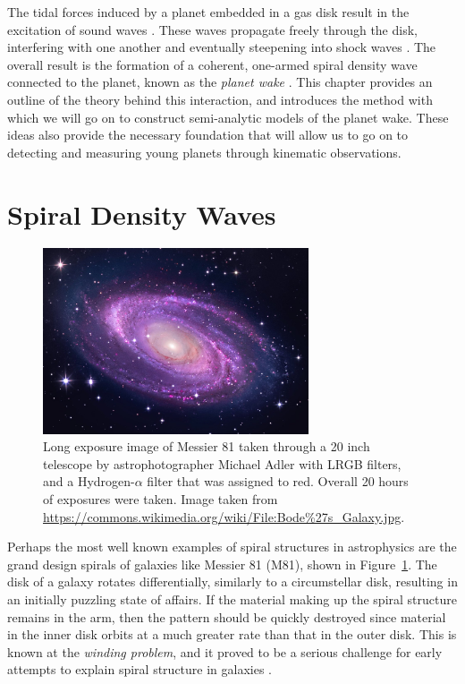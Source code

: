 The tidal forces induced by a planet embedded in a gas disk result in the excitation of sound waves \citep{goldreich1980}.
These waves propagate freely through the disk, interfering with one another and eventually steepening into shock waves \citep{goodman2001}.
The overall result is the formation of a coherent, one-armed spiral density wave connected to the planet, known as the \textit{planet wake} \citep{ogilvie2002}. 
This chapter provides an outline of the theory behind this interaction, and introduces the method with which we will go on to construct semi-analytic models of the planet wake.
These ideas also provide the necessary foundation that will allow us to go on to detecting and measuring young planets through kinematic observations.

\section{Spiral Density Waves}

\begin{figure}
    \centering
    \includegraphics[width = 0.7\textwidth]{figures/M81.jpeg}
    \caption{Long exposure image of Messier 81 taken through a 20 inch telescope by astrophotographer Michael Adler with LRGB filters, and a Hydrogen-$\alpha$ filter that was assigned to red. Overall 20 hours of exposures were taken. Image taken from \url{https://commons.wikimedia.org/wiki/File:Bode\%27s_Galaxy.jpg}.}
    \label{fig:M81}
\end{figure}

Perhaps the most well known examples of spiral structures in astrophysics are the grand design spirals of galaxies like Messier 81 (M81), shown in Figure~\ref{fig:M81}.
The disk of a galaxy rotates differentially, similarly to a circumstellar disk, resulting in an initially puzzling state of affairs.
If the material making up the spiral structure remains in the arm, then the pattern should be quickly destroyed since material in the inner disk orbits at a much greater rate than that in the outer disk.
This is known at the \textit{winding problem}, and it proved to be a serious challenge for early attempts to explain spiral structure in galaxies \citep{wilczynski1896,oort1962}.

